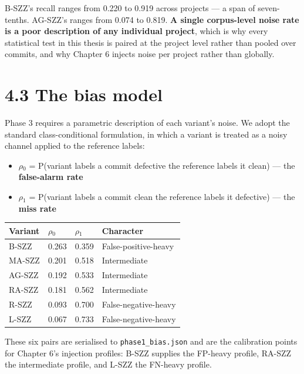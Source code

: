 B-SZZ's recall ranges from 0.220 to 0.919 across projects --- a span of
seven-tenths. AG-SZZ's ranges from 0.074 to 0.819. \textbf{A single
corpus-level noise rate is a poor description of any individual
project}, which is why every statistical test in this thesis is paired
at the project level rather than pooled over commits, and why Chapter 6
injects noise per project rather than globally.

\section{4.3 The bias model}\label{the-bias-model}

Phase 3 requires a parametric description of each variant's noise. We
adopt the standard class-conditional formulation, in which a variant is
treated as a noisy channel applied to the reference labels:

\begin{itemize}
\tightlist
\item
  \textbf{\ensuremath{\rho}\ensuremath{_0}} = P(variant labels a commit defective \textbar{} the
  reference labels it clean) --- the \textbf{false-alarm rate}
\item
  \textbf{\ensuremath{\rho}\ensuremath{_1}} = P(variant labels a commit clean \textbar{} the reference
  labels it defective) --- the \textbf{miss rate}
\end{itemize}

\begin{longtable}[]{@{}llll@{}}
\toprule\noalign{}
Variant & \ensuremath{\rho}\ensuremath{_0} & \ensuremath{\rho}\ensuremath{_1} & Character \\
\midrule\noalign{}
\endhead
\bottomrule\noalign{}
\endlastfoot
B-SZZ & 0.263 & 0.359 & False-positive-heavy \\
MA-SZZ & 0.201 & 0.518 & Intermediate \\
AG-SZZ & 0.192 & 0.533 & Intermediate \\
RA-SZZ & 0.181 & 0.562 & Intermediate \\
R-SZZ & 0.093 & 0.700 & False-negative-heavy \\
L-SZZ & 0.067 & 0.733 & False-negative-heavy \\
\end{longtable}

These six pairs are serialised to \texttt{phase1\_bias.json} and are the
calibration points for Chapter 6's injection profiles: B-SZZ supplies
the FP-heavy profile, RA-SZZ the intermediate profile, and L-SZZ the
FN-heavy profile.

